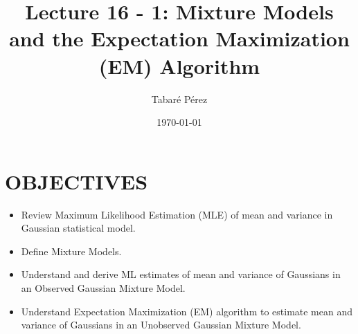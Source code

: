 \documentclass[a4paper, 12pt]{article}
\author{Tabaré Pérez}
\date{\today}
\title{Lecture 16 - 1: Mixture Models and the Expectation Maximization (EM) Algorithm}
\begin{document}
\maketitle

\section*{OBJECTIVES}
\label{sec:org5e04258}
\begin{itemize}
\item Review Maximum Likelihood Estimation (MLE) of mean and variance in Gaussian
statistical model.
\item Define Mixture Models.
\item Understand and derive ML estimates of mean and variance of Gaussians in an
Observed Gaussian Mixture Model.
\item Understand Expectation Maximization (EM) algorithm to estimate mean and
variance of Gaussians in an Unobserved Gaussian Mixture Model.
\end{itemize}
\end{document}
